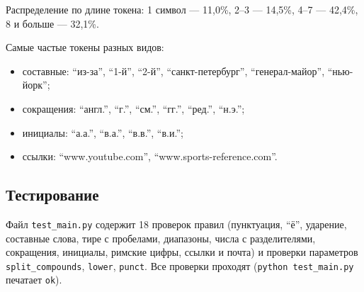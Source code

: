 Распределение по длине токена: 1 символ --- 11{,}0\%, 2--3 --- 14{,}5\%,
4--7 --- 42{,}4\%, 8 и больше --- 32{,}1\%.

Самые частые токены разных видов:
\begin{itemize}
    \item составные: \enquote{из-за}, \enquote{1-й}, \enquote{2-й}, \enquote{санкт-петербург},
    \enquote{генерал-майор}, \enquote{нью-йорк};
    \item сокращения: \enquote{англ.}, \enquote{г.}, \enquote{см.}, \enquote{гг.},
    \enquote{ред.}, \enquote{н.э.};
    \item инициалы: \enquote{а.а.}, \enquote{в.а.}, \enquote{в.в.}, \enquote{в.и.};
    \item ссылки: \enquote{www.youtube.com}, \enquote{www.sports-reference.com}.
\end{itemize}

\subsection{Тестирование}
Файл \texttt{test\_main.py} содержит 18 проверок правил (пунктуация, \enquote{ё},
ударение, составные слова, тире с пробелами, диапазоны, числа с разделителями,
сокращения, инициалы, римские цифры, ссылки и почта) и проверки параметров
\texttt{split\_}\allowbreak\texttt{compounds}, \texttt{lower}, \texttt{punct}. Все проверки
проходят (\texttt{python test\_main.py} печатает \texttt{ok}).
